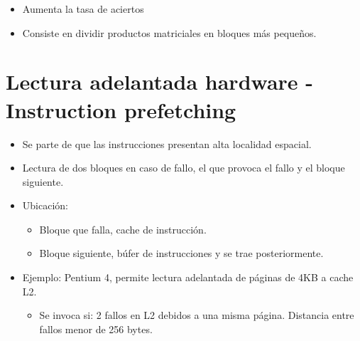 \documentclass[12pt, twoside, openright]{report} %
\begin{document}
\begin{itemize}
\begin{itemize}
        \begin{itemize}
        
        \item
          Aumenta la tasa de aciertos
        \item
          Consiste en dividir productos matriciales en bloques más
          pequeños.
        \end{itemize}
      \end{itemize}
    \end{itemize}
  \section{Lectura adelantada hardware - Instruction prefetching}

    \begin{itemize}
    
    \item
      Se parte de que las instrucciones presentan alta localidad
      espacial.
    \item
      Lectura de dos bloques en caso de fallo, el que provoca el fallo y
      el bloque siguiente.
    \item
      Ubicación:

      \begin{itemize}
      
      \item
        Bloque que falla, cache de instrucción.
      \item
        Bloque siguiente, búfer de instrucciones y se trae
        posteriormente.
      \end{itemize}
    \item
      Ejemplo: Pentium 4, permite lectura adelantada de páginas de 4KB a
      cache L2.

      \begin{itemize}
      
      \item
        Se invoca si: 2 fallos en L2 debidos a una misma página.
        Distancia entre fallos menor de 256 bytes.
      \end{itemize}
    \end{itemize}
    \pagebreak
\end{document}
